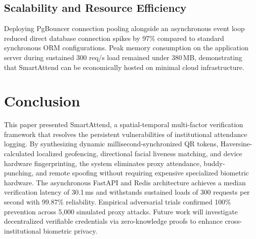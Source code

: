 \documentclass[conference]{IEEEtran}
\begin{document}
\subsection{Scalability and Resource Efficiency}
Deploying PgBouncer connection pooling alongside an asynchronous event loop reduced direct database connection spikes by 97\% compared to standard synchronous ORM configurations. Peak memory consumption on the application server during sustained 300 req/s load remained under 380\,MB, demonstrating that SmartAttend can be economically hosted on minimal cloud infrastructure.

\section{Conclusion}
This paper presented SmartAttend, a spatial-temporal multi-factor verification framework that resolves the persistent vulnerabilities of institutional attendance logging. By synthesizing dynamic millisecond-synchronized QR tokens, Haversine-calculated localized geofencing, directional facial liveness matching, and device hardware fingerprinting, the system eliminates proxy attendance, buddy-punching, and remote spoofing without requiring expensive specialized biometric hardware. The asynchronous FastAPI and Redis architecture achieves a median verification latency of 30.1\,ms and withstands sustained loads of 300 requests per second with 99.87\% reliability. Empirical adversarial trials confirmed 100\% prevention across 5,000 simulated proxy attacks. Future work will investigate decentralized verifiable credentials via zero-knowledge proofs to enhance cross-institutional biometric privacy.
\end{document}
